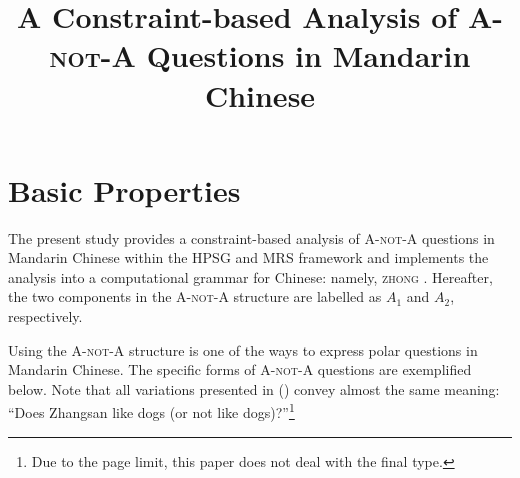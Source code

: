 \documentclass[11pt]{article}
\title{A Constraint-based Analysis of \textsc{A-not-A} Questions in Mandarin Chinese}
\date{}
\newcommand{\zhonglogo}{\texttt{\raisebox{0.4pt}{\scriptsize[}\raisebox{-0.5pt}{|}\raisebox{0.4pt}{\scriptsize]}}}
\newcommand{\zhong}{\textsc{zhong} {\zhonglogo}}
\def\anota{\textsc{A-not-A}}
\def\aone{$A_1$}
\def\atwo{$A_2$}
\newcommand{\myref}[1]{(\getref{#1})}
\begin{document}
\maketitle


\section{Basic Properties}
\label{sec:properties}


The present study provides a constraint-based analysis of {\anota}
questions in Mandarin Chinese within the HPSG and MRS
\cite{pollard:sag:94,copestake:etal:05} framework and implements the
analysis into a computational grammar for Chinese: namely, \zhong.
Hereafter, the two components in the {\anota} structure are labelled
as {\aone} and {\atwo}, respectively.



Using the {\anota} structure is one of the ways to express polar
questions in Mandarin Chinese.  The specific forms of {\anota}
questions are exemplified below.  Note that all variations presented
in \myref{exe:vnotv} convey almost the same meaning: ``Does Zhangsan
like dogs (or not like dogs)?''\footnote{Due to the page limit, this
  paper does not deal with the final type.}


{\small 
{}}
\vspace{-20pt}
\end{document}
